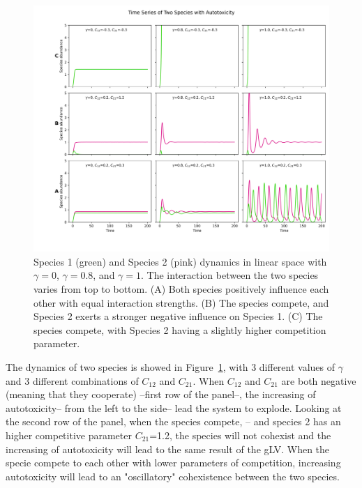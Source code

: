 \documentclass[11pt,a4paper,fleqn]{scrartcl}
\begin{document}
\begin{figure}[H]
    \centering

    \includegraphics[width=\linewidth]{SingleSpecies/TwoSpecies3Cases.png}
    \caption{Species 1 (green) and Species 2 (pink) dynamics in linear space with $\gamma=0$, $\gamma=0.8$, and $\gamma=1$. The interaction between the two species varies from top to bottom. 
    (A) Both species positively influence each other with equal interaction strengths. 
    (B) The species compete, and Species 2 exerts a stronger negative influence on Species 1. 
    (C) The species compete, with Species 2 having a slightly higher competition parameter.}
\label{figtwospecies}
\end{figure}

The dynamics of two species is showed in Figure~\ref{figtwospecies}, with 3 different values of $\gamma$ and 3 different combinations of $C_{12}$ and $C_{21}$.
When $C_{12}$ and $C_{21}$ are both negative (meaning that they cooperate) --first row of the panel--, the increasing of autotoxicity-- from the left to the side-- lead the system to explode. Looking at the second row of the panel, when the species compete, -- and species 2 has an higher competitive parameter $C_{21}$=1.2, the species will not cohexist and the increasing of autotoxicity will lead to the same result of the gLV. When the specie compete to each other with lower parameters of competition, increasing autotoxicity will lead to an "oscillatory" cohexistence between the two species. 
\end{document}
